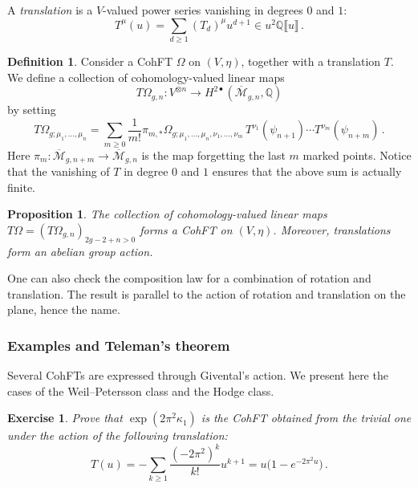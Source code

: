 \documentclass[11pt,reqno]{amsart}
\numberwithin{equation}{section}
\newcommand{\bbraket}[1]{\llbracket #1 \rrbracket}
\newcommand{\mb}[1]{\mathbb{#1}}
\newcommand{\mc}[1]{\mathcal{#1}}
\newcommand{\Q}{\mb{Q}}
\newcommand{\M}{\mc{M}}
\newcommand{\Mbar}{\overline{\M}}
\theoremstyle{plain}
\newtheorem{proposition}[theorem]{Proposition}
\newtheorem{exercise}{Exercise}[section]
\theoremstyle{definition}
\newtheorem{definition}[theorem]{Definition}
\begin{document}
A \emph{translation} is a $V$-valued power series vanishing in degrees $0$ and $1$:
\begin{equation}
  T^{\mu}(u) = \sum_{d \ge 1} (T_d)^{\mu} u^{d+1} \in u^2 \Q\bbraket{u} \,.
\end{equation}

\begin{definition}
  Consider a CohFT $\Omega$ on $(V,\eta)$, together with a translation $T$. We define a collection of cohomology-valued linear maps
  \begin{equation}
    T\Omega_{g,n} \colon V^{\otimes n} \rightarrow H^{2\bullet}(\Mbar_{g,n},\Q)
  \end{equation}
  by setting
  \begin{equation}
    T\Omega_{g;\mu_1,\ldots,\mu_n}
    =
    \sum_{m \ge 0}
      \frac{1}{m!} \pi_{m,\ast}
      \Omega_{g;\mu_1, \ldots, \mu_n,\nu_1,\ldots,\nu_m} \,
      T^{\nu_1}(\psi_{n+1}) \cdots T^{\nu_m}(\psi_{n+m}) \,.
  \end{equation}
  Here $\pi_m \colon \Mbar_{g,n+m} \to \Mbar_{g,n}$ is the map forgetting the last $m$ marked points. Notice that the vanishing of $T$ in degree $0$ and $1$ ensures that the above sum is actually finite.
\end{definition}

\begin{proposition}
  The collection of cohomology-valued linear maps $T\Omega = (T\Omega_{g,n})_{2g-2+n > 0}$ forms a CohFT on $(V,\eta)$. Moreover, translations form an abelian group action.
\end{proposition}

One can also check the composition law for a combination of rotation and translation. The result is parallel to the action of rotation and translation on the plane, hence the name.

\subsubsection{Examples and Teleman's theorem}
Several CohFTs are expressed through Givental's action. We present here the cases of the Weil--Petersson class and the Hodge class.

\begin{exercise}\label{ex:WP:CohFT}
  Prove that $\exp(2\pi^2 \kappa_1)$ is the CohFT obtained from the trivial one under the action of the following translation:
  \begin{equation}
    T(u)
    =
    - \sum_{k \ge 1} \frac{(-2\pi^2)^k}{k!} u^{k+1}
    =
    u\bigl( 1 - e^{-2\pi^2 u} \bigr) \,.
  \end{equation}
\end{exercise}
\end{document}
